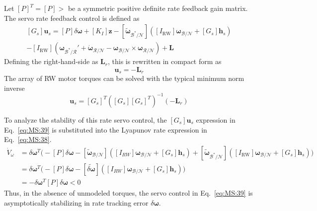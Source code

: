 \documentclass[]{BasiliskReportMemo}
\begin{document}
Let $[P]^{T} = [P]>$ be a symmetric positive definite rate feedback gain matrix.  The servo rate feedback control is defined as
\begin{multline}
	\label{eq:MS:39}
	[G_{s}]\bm u_{s} = [P]\delta\bm\omega + [K_{I}]\bm z - [\tilde{\bm\omega}_{\mathcal{B}^{\ast}/\mathcal{N}}] 
	\left( [I_{\text{RW}}] \bm\omega_{\mathcal{B}/\mathcal{N}} + [G_{s}] \bm h_{s} \right)
	\\
	- [I_{\text{RW}}](\bm\omega_{\mathcal{B}^{\ast}/\mathcal{R}} ' +  \dot{\bm\omega}_{\mathcal{R}/\mathcal{N}} -  {\bm\omega}_{\mathcal{B}/\mathcal{N}} \times  \bm\omega_{\mathcal{R}/\mathcal{N}}) + \bm L
\end{multline}
Defining the right-hand-side as $\bm L_{r}$, this is rewritten in compact form as
\begin{equation}
	[G_{s}]\bm u_{s} = -\bm L_{r}
\end{equation}
The array of RW motor torques can be solved with the typical minimum norm inverse
\begin{equation}
	\bm u_{s} = [G_{s}]^{T}\left( [G_{s}][G_{s}]^{T}\right)^{-1} (- \bm L_{r})
\end{equation}


To analyze the stability of this rate servo control, the $[G_{s}]\bm u_{s}$ expression in Eq.~\eqref{eq:MS:39} is substituted into the Lyapunov rate expression in Eq.~\eqref{eq:MS:38}.
\begin{align}
	\label{eq:MS:42}
	\dot V_{\omega} &= \delta\bm\omega^{T} \Big(
		- [P]\delta\bm\omega - [\tilde{\bm \omega}_{\mathcal{B}/\mathcal{N}}] \left( 
	[I_{RW}] \bm\omega_{\mathcal{B}/\mathcal{N}} + [G_{s}] \bm h_{s} 
	\right) 
	+ [\tilde{\bm\omega}_{\mathcal{B}^{\ast}/\mathcal{N}}] 
	\left( [I_{\text{RW}}] \bm\omega_{\mathcal{B}/\mathcal{N}} + [G_{s}] \bm h_{s} \right)
	\Big ) 
	\nonumber \\
	&= \delta\bm\omega^{T} \Big( - [P]\delta\bm\omega
	- [\widetilde{\delta\bm \omega}] \left( 
	[I_{RW}] \bm\omega_{\mathcal{B}/\mathcal{N}} + [G_{s}] \bm h_{s} 
	\right) 
	\Big )
	\nonumber \\
	&= - \delta\bm\omega ^{T} [P] \delta\bm\omega < 0
\end{align}
Thus, in the absence of unmodeled torques, the servo control in Eq.~\eqref{eq:MS:39} is asymptotically stabilizing in rate tracking error $\delta\bm\omega$.  
\end{document}
